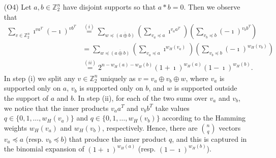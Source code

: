 \documentclass[twoside,romanappendices]{IEEEtran}
\begin{document}
\begin{enumerate}
\item[(O4)] Let $a,b \in \mathbb{Z}_2^n$ have disjoint supports so that $a \ast b = 0$. Then we observe that
\begin{align}
\sum_{v \in \mathbb{Z}_2^n} \imath^{va^T} (-\imath)^{vb^T} & \overset{(i)}{=} \sum_{w \preceq \overline{(a \oplus b)}} \left( \sum_{v_a \preceq a} \imath^{v_a a^T} \right) \left( \sum_{v_b \preceq b} (-\imath)^{v_b b^T} \right) \\
%
  & = \sum_{w \preceq \overline{(a \oplus b)}} \left( \sum_{v_a \preceq a} \imath^{w_H(v_a)} \right) \left( \sum_{v_b \preceq b} (-\imath)^{w_H(v_b)} \right) \\
%
  & \overset{(ii)}{=} 2^{n - w_H(a) - w_H(b)} (1 + \imath)^{w_H(a)} (1 - \imath)^{w_H(b)}.
\end{align}
In step (i) we split any $v \in \mathbb{Z}_2^n$ uniquely as $v = v_a \oplus v_b \oplus w$, where $v_a$ is supported only on $a$, $v_b$ is supported only on $b$, and $w$ is supported outside the support of $a$ and $b$.
In step (ii), for each of the two sums over $v_a$ and $v_b$, we notice that the inner products $v_a a^T$ and $v_b b^T$ take values $q \in \{ 0,1,\ldots,w_H(v_a) \}$ and $q \in \{ 0,1,\ldots,w_H(v_b) \}$ according to the Hamming weights $w_H(v_a)$ and $w_H(v_b)$, respectively.
Hence, there are $\binom{n}{q}$ vectors $v_a \preceq a$ (resp. $v_b \preceq b$) that produce the inner product $q$, and this is captured in the binomial expansion of $(1 + \imath)^{w_H(a)}$ (resp. $(1 - \imath)^{w_H(b)}$).

\end{enumerate}
\end{document}
